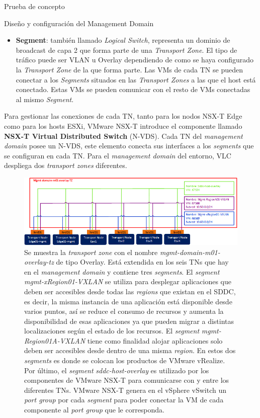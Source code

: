 \begin{section}{Prueba de concepto}
\begin{subsection}{Diseño y configuración del Management Domain}
\begin{itemize}
      \item \textbf{Segment}: también llamado \textit{Logical Switch}, representa un dominio de broadcast de capa 2 que forma parte de una \textit{Transport Zone}. El tipo de tráfico puede ser VLAN u Overlay dependiendo de como se haya configurado la \textit{Transport Zone} de la que forma parte. Las VMs de cada TN se pueden conectar a los \textit{Segments} situados en las \textit{Transport Zones} a las que el host está conectado. Estas VMs se pueden comunicar con el resto de VMs conectadas al mismo \textit{Segment}.
       
    \end{itemize}
    Para gestionar las conexiones de cada TN, tanto para los nodos NSX-T Edge como para los hosts ESXi, VMware NSX-T introduce el componente llamado \textbf{NSX-T Virtual Distributed Switch} (N-VDS). Cada TN del \textit{management domain} posee un N-VDS, este elemento conecta sus interfaces a los \textit{segments} que se configuran en cada TN. Para el \textit{management domain} del entorno, VLC despliega dos \textit{transport zones} diferentes.
    \begin{figure}[h]
      \centering
      \includegraphics[width=1\textwidth]{imaxes/pruebaconcepto/OverlayTZSegments.png}
      \caption{Se muestra la \textit{transport zone} con el nombre \textit{mgmt-domain-m01-overlay-tz} de tipo Overlay. Está extendida en los seis TNs que hay en el \textit{management domain} y contiene tres \textit{segments}. El \textit{segment} \textit{mgmt-xRegion01-VXLAN} se utiliza para desplegar aplicaciones que deben ser accesibles desde todas las \textit{regions} que existan en el SDDC, es decir, la misma instancia de una aplicación está disponible desde varios puntos, así se reduce el consumo de recursos y aumenta la disponibilidad de esas aplicaciones ya que pueden migrar a distintas localizaciones según el estado de los recursos. El \textit{segment} \textit{mgmt-Region01A-VXLAN} tiene como finalidad alojar aplicaciones solo deben ser accesibles desde dentro de una misma \textit{region}. En estos dos \textit{segments} es donde se colocan los productos de VMware vRealize. Por último, el \textit{segment} \textit{sddc-host-overlay} es utilizado por los componentes de VMware NSX-T para comunicarse con y entre los diferentes TNs. VMware NSX-T genera en el vSphere vSwitch un \textit{port group} por cada \textit{segment} para poder conectar la VM de cada componente al \textit{port group} que le corresponda.}
      \label{fig:overlay-TZ-segments-NSXT}
    \end{figure}


\end{subsection}
\end{section}
